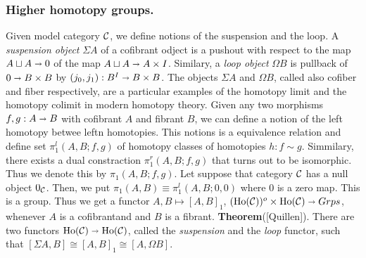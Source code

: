 	 \subsubsection{Higher homotopy groups.} Given model category $\mathcal{C}$, we define notions of the suspension and the loop.
	 A \textit{suspension object} $\Sigma A$ of a cofibrant odject is a pushout with respect to the map $ A \sqcup A \shortrightarrow 0 $ of the map $ A \sqcup A \shortrightarrow A \times I $. Similary, a \textit{loop object} $\Omega B$ is pullback of  $ 0 \shortrightarrow B \times B $ by 
	 $ (j_{0}, j_{1}) : B^{I} \shortrightarrow B \times B $. The objects $\Sigma A$ and $\Omega B$, called also cofiber and fiber respectively, are a particular examples of the homotopy limit and the homotopy colimit in modern homotopy theory.
	 \newline
	 \newline
	 Given any two morphisms $ f, g : A \shortrightarrow B  $ with cofibrant $A$ and fibrant $B$, we can define a notion of the left homotopy betwee leftn homotopies. This notions is a equivalence relation and define set $ \pi_{1}^{l} (A,B;f,g) $ of homotopy classes of
	 homotopies $ h : f \sim g $. Simmilary, there exists a dual constraction $ \pi_{1}^{r} (A,B;f,g)$ that turns out to be isomorphic.
	 Thus we  denote this by $ \pi_{1} (A,B;f,g) $. Let suppose that category $\mathcal{C}$ has a null object $0_{\mathcal{C}}$. Then, we put
	 $ \pi_{1}(A,B) \equiv \pi_{1}^{l} (A,B;0,0) $ where $0$ is a zero map. This is a group. Thus we get a functor
	 $ A, B \longmapsto [A, B]_{1} $, $ (\operatorname*{\text{Ho}} (\mathcal{C}))^{o}  \times  \operatorname*{\text{Ho}} (\mathcal{C}) \shortrightarrow Grps $, whenever $A$ is a cofibrantand and
	 $B$ is a fibrant.
	 \newline
	 \newline   
	 \textbf{Theorem}([Quillen]). There are two functors $ \operatorname*{\text{Ho}}(\mathcal{C}) \shortrightarrow \operatorname*{\text{Ho}}({\mathcal{C}}) $, called the \textit{suspension} and the
	 \textit{loop} functor, such that $ [\Sigma A, B] \cong [A, B]_{1} \cong [A, \Omega B] $.
	  
